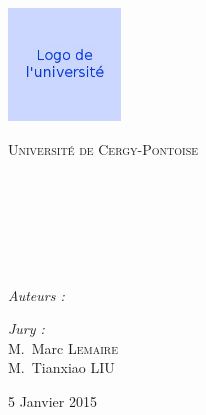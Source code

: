 
\begin{titlepage}

\begin{center}

\begin{minipage}[t]{0.48\textwidth}
  \begin{flushleft}
    \includegraphics [width=30mm]{images/logo-univ.jpg} \\[0.5cm]
    \begin{spacing}{1.5}
      \textsc{\LARGE Université de Cergy-Pontoise}
    \end{spacing}
  \end{flushleft}
\end{minipage}
\begin{minipage}[t]{0.48\textwidth}
  \begin{flushright}
  \end{flushright}
\end{minipage} \\[1.5cm]

\textsc{\Large \reportsubject}\\[0.5cm]
\HRule \\[0.4cm]
{\huge \bfseries \reporttitle}\\[0.4cm]
\HRule \\[1.5cm]

\begin{minipage}[t]{0.3\textwidth}
  \begin{flushleft} \large
    \emph{Auteurs :}\\
    \reportauthor
  \end{flushleft}
\end{minipage}
\begin{minipage}[t]{0.6\textwidth}
  \begin{flushright} \large
    \emph{Jury :} \\
    M.~Marc \textsc{Lemaire} \\
    M.~Tianxiao \textsc{LIU}
  \end{flushright}
\end{minipage}

\vfill

{\large 5 Janvier 2015}

\end{center}

\end{titlepage}
